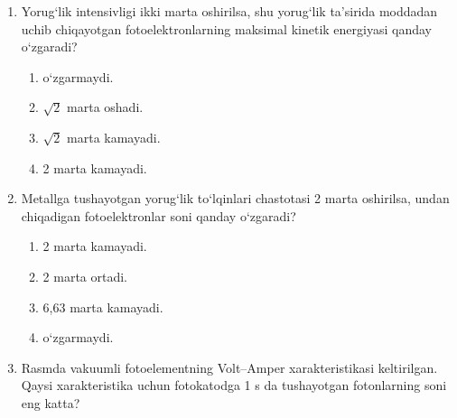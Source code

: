 \begin{enumerate}
\begin{enumerate}[label=\Alph*)]
\item 5.
\item 6.
\item 9.
\item 11.
\end{enumerate}

\setcounter{enumi}{15}
\item Yorug‘lik intensivligi ikki marta oshirilsa, shu yorug‘lik ta’sirida moddadan uchib chiqayotgan fotoelektronlarning maksimal kinetik energiyasi qanday o‘zgaradi?
\begin{enumerate}[label=\Alph*)]
\item o‘zgarmaydi.
\item $\sqrt{2}$ marta oshadi.
\item $\sqrt{2}$ marta kamayadi.
\item 2 marta kamayadi.
\end{enumerate}

\item Metallga tushayotgan yorug‘lik to‘lqinlari chastotasi 2 marta oshirilsa, undan chiqadigan fotoelektronlar soni qanday o‘zgaradi?
\begin{enumerate}[label=\Alph*)]
\item 2 marta kamayadi.
\item 2 marta ortadi.
\item 6,63 marta kamayadi.
\item o‘zgarmaydi.
\end{enumerate}

\item Rasmda vakuumli fotoelementning Volt--Amper xarakteristikasi keltirilgan. Qaysi xarakteristika uchun fotokatodga 1 s da tushayotgan fotonlarning soni eng katta?

\begin{center}
\end{center}


\end{enumerate}
